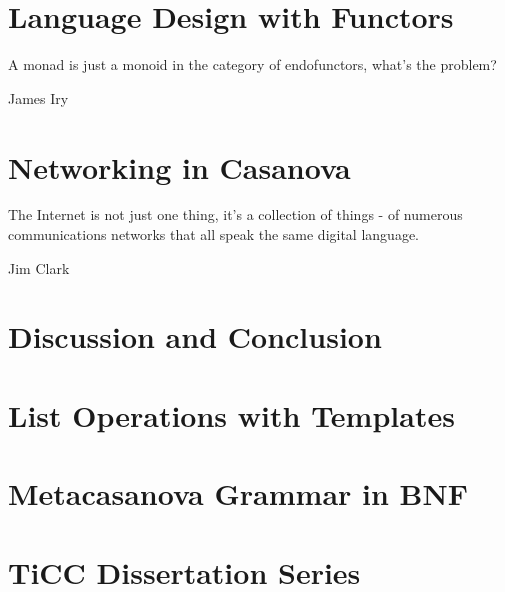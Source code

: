 \documentclass[9pt,b5paper,openright]{extbook}
\theoremstyle{definition}
\begin{document}
\chapter{Language Design with Functors}
\label{ch:functor_languages}
\epigraph{A monad is just a monoid in the category of endofunctors, what's the problem?}{James Iry}


\chapter{Networking in Casanova}
\label{ch:networking}
\epigraph{The Internet is not just one thing, it's a collection of things - of numerous communications networks that all speak the same digital language.}{Jim Clark}


\chapter{Discussion and Conclusion}
\label{ch:discussion}


\appendix
\chapter{List Operations with Templates}
\label{app:template}


\chapter{Metacasanova Grammar in BNF}
\label{app:metacasanova_grammar}


\backmatter




\chapter*{TiCC Dissertation Series}

\end{document}
